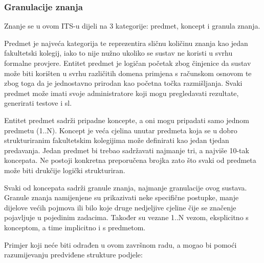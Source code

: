 \documentclass[times, utf8, zavrsni, numeric]{fer}
\begin{document}
\subsubsection{Granulacije znanja}
Znanje se u ovom ITS-u dijeli na 3 kategorije: predmet, koncept i granula znanja.
\par 
Predmet je najveća kategorija te reprezentira sličnu količinu znanja kao jedan fakultetski kolegij, iako to nije nužno ukoliko se sustav ne koristi u svrhu formalne provjere. Entitet predmet je logičan početak zbog činjenice da sustav može biti korišten u svrhu različitih domena primjena s računskom osnovom te zbog toga da je jednostavno prirodan kao početna točka razmišljanja. Svaki predmet može imati svoje administratore koji mogu pregledavati rezultate, generirati testove i sl.
\par
Entitet predmet sadrži pripadne koncepte, a oni mogu pripadati samo jednom predmetu (1..N). Koncept je veća cjelina unutar predmeta koja se u dobro strukturiranim fakultetskim kolegijima može definirati kao jedan tjedan predavanja. Jedan predmet bi trebao sadržavati najmanje tri, a najviše 10-tak koncepata. Ne postoji konkretna preporučena brojka zato što svaki od predmeta može biti drukčije logički strukturiran.
\par
Svaki od koncepata sadrži granule znanja, najmanje granulacije ovog sustava. Granule znanja namijenjene su prikazivati neke specifične postupke, manje dijelove većih pojmova ili bilo koje druge nedjeljive cjeline čije se značenje pojavljuje u pojedinim zadacima. Također su vezane 1..N vezom, eksplicitno s konceptom, a time implicitno i s predmetom.
\pagebreak
\par
Primjer koji neće biti odrađen u ovom završnom radu, a mogao bi pomoći razumijevanju predviđene strukture podjele:
\end{document}
